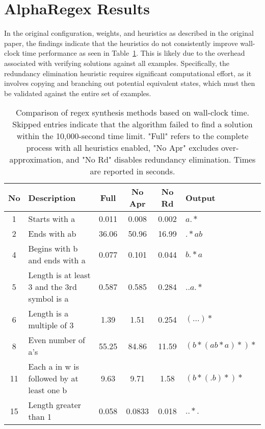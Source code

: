 \section{AlphaRegex Results}

\indent\indent In the original configuration, weights, and heuristics as described in the original paper, the findings indicate that the heuristics do not consistently improve wall-clock time performance as seen in Table~\ref{tab:alpha_regex_performance_seconds}. This is likely due to the overhead associated with verifying solutions against all examples. Specifically, the redundancy elimination heuristic requires significant computational effort, as it involves copying and branching out potential equivalent states, which must then be validated against the entire set of examples. 

\begin{table}[h!]
	\centering
	\caption{Comparison of regex synthesis methods based on wall-clock time. Skipped entries indicate that the algorithm failed to find a solution within the 10,000-second time limit. "Full" refers to the complete process with all heuristics enabled, "No Apr" excludes over-approximation, and "No Rd" disables redundancy elimination. Times are reported in seconds.}
	\label{tab:alpha_regex_performance_seconds}
	\begin{tabular}{|c|p{5cm}|c|c|c|l|}
	\hline
	\textbf{No} & \textbf{Description} & \textbf{Full} & \textbf{No Apr} & \textbf{No Rd} & \textbf{Output} \\
	\hline
	1 & Starts with a & 0.011 & 0.008 & 0.002 & $a.*$ \\
	2 & Ends with ab & 36.06 & 50.96 & 16.99 & $.*ab$ \\
	4 & Begins with b and ends with a & 0.077 & 0.101 & 0.044 & $b.*a$ \\
	5 & Length is at least 3 and the 3rd symbol is a & 0.587 & 0.585 & 0.284 & $..a.*$ \\
	6 & Length is a multiple of 3 & 1.39 & 1.51 & 0.254 & $(...)*$ \\
	8 & Even number of a's & 55.25 & 84.86 & 11.59 & $(b*(ab*a)*)*$ \\
	11 & Each a in w is followed by at least one b & 9.63 & 9.71 & 1.58 & $(b*(.b)*)*$ \\
	15 & Length greater than 1 & 0.058 & 0.0833 & 0.018 & $..*.$ \\
	\hline
\end{tabular}
\end{table}


